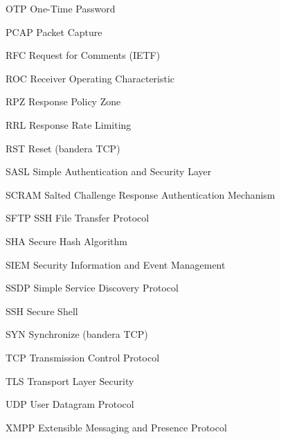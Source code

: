 \begin{abbrv}
\item[OTP] One-Time Password
\item[PCAP] Packet Capture
\item[RFC] Request for Comments (IETF)
\item[ROC] Receiver Operating Characteristic
\item[RPZ] Response Policy Zone
\item[RRL] Response Rate Limiting
\item[RST] Reset (bandera TCP)
\item[SASL] Simple Authentication and Security Layer
\item[SCRAM] Salted Challenge Response Authentication Mechanism
\item[SFTP] SSH File Transfer Protocol
\item[SHA] Secure Hash Algorithm
\item[SIEM] Security Information and Event Management
\item[SSDP] Simple Service Discovery Protocol
\item[SSH] Secure Shell
\item[SYN] Synchronize (bandera TCP)
\item[TCP] Transmission Control Protocol
\item[TLS] Transport Layer Security
\item[UDP] User Datagram Protocol
\item[XMPP] Extensible Messaging and Presence Protocol

\end{abbrv}
